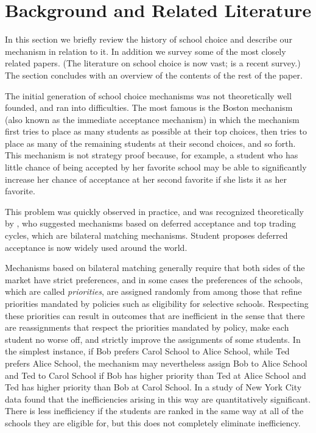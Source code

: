 \documentclass[12pt]{article}
\theoremstyle{definition}
\begin{document}
\section{Background and Related Literature}

In this section we briefly review the history of school choice and describe our mechanism in relation to it.  In addition we survey some of the most closely related papers. (The literature on school choice is now vast; \citet{aa22nber} is a recent survey.)  The section concludes with an overview of the contents of the rest of the paper.

The initial generation of school choice mechanisms was not theoretically well founded, and ran into difficulties.  The most famous is the Boston mechanism (also known as the immediate acceptance mechanism) in which the mechanism first tries to place as many students as possible at their top choices, then tries to place as many of the remaining students at their second choices, and so forth.  This mechanism is not strategy proof because, for example, a student who has little chance of being accepted by her favorite school may be able to significantly increase her chance of acceptance at her second favorite if she lists it as her favorite.

This problem was quickly observed in practice, and was recognized theoretically by \cite{as03aer}, who suggested mechanisms based on deferred acceptance and top trading cycles, which are bilateral matching mechanisms.   Student proposes deferred acceptance is now widely used around the world.

Mechanisms based on bilateral matching generally require that both sides of the market have strict preferences, and in some cases the preferences of the schools, which are called \emph{priorities}, are assigned randomly from among those that refine priorities mandated by policies such as eligibility for selective schools.  Respecting these priorities can result in outcomes that are inefficient in the sense that there are reassignments that respect the priorities mandated by policy, make each student no worse off, and strictly improve the assignments of some students.   In the simplest instance, if Bob prefers Carol School to Alice School, while Ted prefers Alice School, the mechanism may nevertheless assign Bob to Alice School and Ted to Carol School if Bob has higher priority than Ted at Alice School and Ted has higher priority than Bob at Carol School. In a study of New York City data \cite{apr09aer} found that the inefficiencies arising in this way are quantitatively significant.  There is less inefficiency if the students are ranked in the same way at all of the schools they are eligible for, but this does not completely eliminate inefficiency. 
\end{document}
